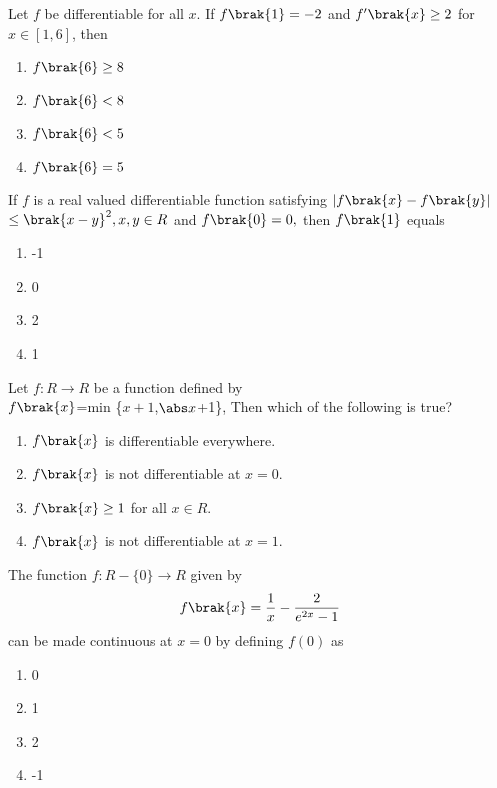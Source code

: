 \iffalse
\title{11. Limits, Continuity and Differentiability }
\author{S.Sai Akshitha - EE24BTECH11054}
\section{mains}
\fi



    \item Let $f$ be differentiable for all $x$. If $f\brak{1}=-2$ and $f'\brak{x} \geq 2$ for $x \in [1,6]$, then   \hfill{}
    
        \begin{enumerate}
    \item $f\brak{6}\geq 8$ \item$f\brak{6} < 8$\item$f\brak{6} <5$\item$f\brak{6}=5$
     \end{enumerate} 
     
    \item If $f$ is a real valued differentiable function satisfying $\lvert f\brak{x} -f\brak{y}\rvert$ $ \leq\brak{x-y}^2,x,y\in R$ and $f\brak{0}=0,$ then $f\brak{1}$ equals \hfill{}
     \begin{multicols}{4}
        \begin{enumerate}
     \item -1\item 0\item 2\item 1
     \end{enumerate} 
     \end{multicols}
     
    \item Let $f:R \to R$ be a function defined by\\$f\brak{x}$=min \{$x+1$,$\abs x$+1\}, Then which of the following is true? 
      \hfill{}
     \begin{enumerate}
     \item $f\brak{x}$ is differentiable everywhere.\item $f\brak{x}$ is not differentiable at $x=0$.\item $f\brak{x} \geq1$ for all $x\in R$.\item $f\brak{x}$ is not differentiable at $x=1$.
     \end{enumerate}
    \item The function $f:R-\{0\}\to R$ given by
    \begin{align*}
        f\brak{x}=\frac{1}{x}-\frac{2}{e^{2x}-1}
    \end{align*} can be made continuous at $x=0$ by defining $f(0)$ as \hfill{}
     \begin{multicols}{4}
         \begin{enumerate}
     \item 0\item1\item 2\item -1
     \end{enumerate}
     \end{multicols}
     
